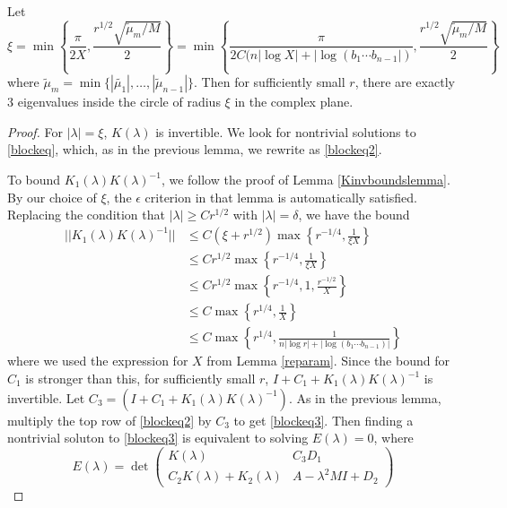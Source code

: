 \documentclass[thesis.tex]{subfiles}
\begin{document}
\begin{lemma}\label{eigcount2}
Let 
\begin{equation}\label{xiradius}
\xi = \min\left\{ \frac{\pi}{2X}, \frac{r^{1/2}\sqrt{\tilde{\mu}_m/M} }{2} \right\} = 
\min\left\{ \frac{\pi}{2 C( n |\log X| + |\log(b_1\cdots b_{n-1}|)}, \frac{r^{1/2} \sqrt{\tilde{\mu}_m/M}}{2} \right\} 
\end{equation}
where $\tilde{\mu}_m = \min \{ |\tilde{\mu_1}|, \dots, |\tilde{\mu}_{n-1}| \}$. Then for sufficiently small $r$, there are exactly 3 eigenvalues inside the circle of radius $\xi$ in the complex plane.

\begin{proof}
For $|\lambda| = \xi$, $K(\lambda)$ is invertible. We look for nontrivial solutions to \eqref{blockeq}, which, as in the previous lemma, we rewrite as \eqref{blockeq2}.

To bound $K_1(\lambda)K(\lambda)^{-1}$, we follow the proof of Lemma \ref{Kinvboundslemma}. By our choice of $\xi$, the $\epsilon$ criterion in that lemma is automatically satisfied. Replacing the condition that $|\lambda| \geq C r^{1/2}$ with $|\lambda| = \delta$, we have the bound
\begin{align*}
||K_1(\lambda)K(\lambda)^{-1}|| &\leq C( \xi + r^{1/2})\max\left\{ r^{-1/4}, \frac{1}{\xi X} \right\} \\
&\leq C r^{1/2} \max\left\{ r^{-1/4}, \frac{1}{\xi X} \right\} \\
&\leq C r^{1/2} \max\left\{ r^{-1/4}, 1, \frac{r^{-1/2}}{X} \right\} \\
&\leq C \max\left\{ r^{1/4}, \frac{1}{X} \right\} \\
&\leq C \max\left\{ r^{1/4}, \frac{1}{n|\log r| + |\log(b_1 \cdots b_{n-1})| } \right\} 
\end{align*}
where we used the expression for $X$ from Lemma \ref{reparam}. Since the bound for $C_1$ is stronger than this, for sufficiently small $r$, $I + C_1 + K_1(\lambda)K(\lambda)^{-1}$ is invertible. Let $C_3 = (I + C_1 + K_1(\lambda)K(\lambda)^{-1})$. As in the previous lemma, multiply the top row of \eqref{blockeq2} by $C_3$ to get \eqref{blockeq3}. Then finding a nontrivial soluton to \eqref{blockeq3} is equivalent to solving $E(\lambda) = 0$, where 
\begin{equation}
E(\lambda) = \det 
\begin{pmatrix}
K(\lambda) & C_3 D_1 \\
C_2 K(\lambda) + K_2(\lambda) & A - \lambda^2 MI + D_2
\end{pmatrix}
\end{equation}


\end{proof}
\end{lemma}
\end{document}
